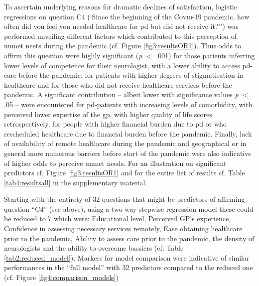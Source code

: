 \documentclass{bmcart}
\begin{document}
To ascertain underlying reasons for dramatic declines of satisfaction, logistic regressions on question C4 (`Since the beginning of the \textsc{Covid}-19 pandemic, how often did you feel you needed healthcare for \acl{pd} but did not receive it?'') was performed unveiling different factors which contributed to this perception of unmet neets during the pandemic (cf. Figure \ref{fig3:resultsOR1}). Thus odds to affirm this question were highly significant (\textit{p} $<$ .001) for those patients inferring lower levels of competence for their neurologist, with a lower ability to access \ac{pd}-care before the pandemic, for patients with higher degrees of stigmatisation in healthcare and for those who did not receive healthcare services before the pandemic. A significant contribution -- albeit lower with significance values \textit{p} $<$ .05 --  were encountered for \ac{pd}-patients with increasing levels of comorbidity, with perceived lower expertise of the \ac{gp}, with higher quality of life scores retrospectively, for people with higher financial burden due to \ac{pd} or who rescheduled healthcare due to financial burden before the pandemic. Finally, lack of availability of remote healthcare during the pandemic and geographical or in general more numerous barriers before start of the pandemic were also indicative of higher odds to perceive unmet needs. For an illustration on significant predictors cf. Figure \ref{fig3:resultsOR1} and for the entire list of results cf. Table  \ref{tab4:resultsall} in the supplementary material. 


Starting with the entirety of 32 questions that might be predictors of affirming question ``C4'' (see above), using a two-way stepwise regression model these could be reduced to 7 which were: Educational level, Perceived GP's experience, Confidence in assessing necessary services remotely, Ease obtaining healthcare prior to the pandemic, Ability to assess care prior to the pandemic, the density of neurologists and the ability to overcome bassiers (cf. Table \ref{tab2:reduced_model}). Markers for model comparison were indicative of similar performances in the ``full model'' with 32 predictors compared to the reduced one (cf. Figure \ref{fig4:comparison_models})
\end{document}
